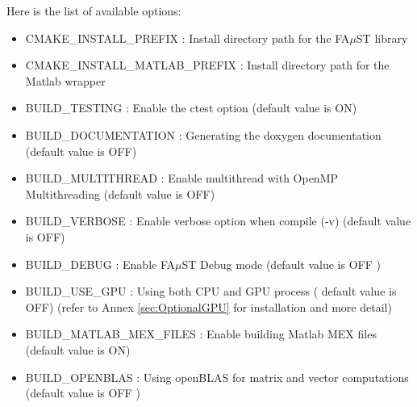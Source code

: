 Here is the list of available options: 
\begin{itemize}
\item CMAKE\_INSTALL\_PREFIX : Install directory path for the FA$\mu$ST library
\item CMAKE\_INSTALL\_MATLAB\_PREFIX : Install directory path for the Matlab wrapper
\item BUILD\_TESTING : Enable the ctest option (default value is ON)
\item BUILD\_DOCUMENTATION : Generating the doxygen documentation (default value is OFF)  
\item BUILD\_MULTITHREAD : Enable multithread with OpenMP Multithreading (default value is OFF)
\item BUILD\_VERBOSE : Enable verbose option when compile (-v) (default value is OFF)
\item BUILD\_DEBUG : Enable FA$\mu$ST Debug mode (default value is OFF )
\item BUILD\_USE\_GPU : Using both CPU and GPU process ( default value is OFF) (refer to Annex \ref{sec:OptionalGPU} for installation and more detail)
\item BUILD\_MATLAB\_MEX\_FILES : Enable building Matlab MEX files (default value is ON)
\item BUILD\_OPENBLAS : Using openBLAS for matrix and vector computations (default value is OFF )

\end{itemize}






